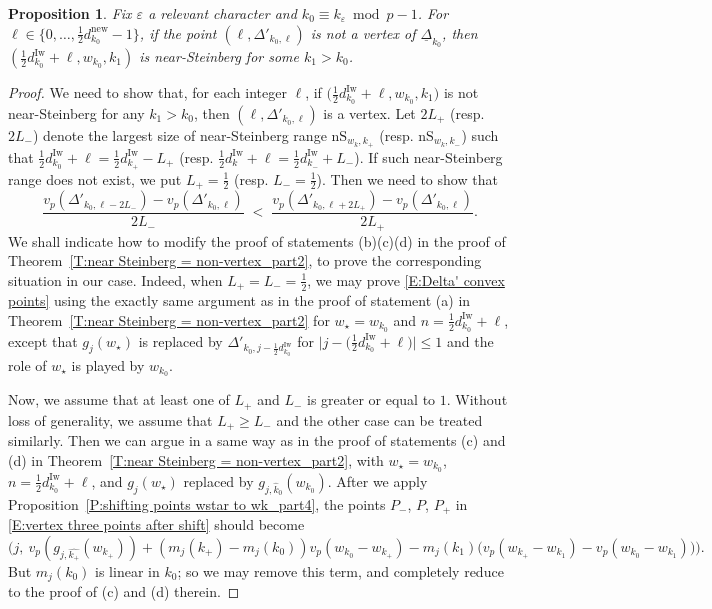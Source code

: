 \documentclass[12pt]{amsart}
\newtheorem{proposition}[subsection]{Proposition}
\theoremstyle{definition}
\numberwithin{equation}{subsection}
\newcommand{\new}{\mathrm{new}}
\newcommand{\Iw}{\mathrm{Iw}}
\newcommand{\nS}{\mathrm{nS}}
\begin{document}
\begin{proposition}
\label{P:vertices of Deltak_part2}
Fix $\varepsilon$ a relevant character and $k_0 \equiv k_\varepsilon \bmod p-1$.
For $\ell \in\{0, \dots, \frac12d_{k_0}^\new-1\}$, if the point $(\ell, \Delta'_{{k_0},\ell})$ is not a vertex of $\underline \Delta_{k_0}$, then $(\frac 12d_{k_0}^\Iw + \ell, w_{k_0}, k_1)$ is near-Steinberg for some  $k_1 > {k_0}$.
\end{proposition}
\begin{proof}
We need to show that, for each integer $\ell$, if $\big(\frac 12d_{k_0}^\Iw + \ell, w_{k_0}, k_1\big)$ is not  near-Steinberg for any $k_1 > {k_0}$, then $(\ell, \Delta'_{{k_0}, \ell})$ is a vertex. Let $2L_+$ (resp. $2L_-$) denote the largest size of near-Steinberg range $\nS_{w_k, k_+}$ (resp. $\nS_{w_k, k_-}$) such that $\frac 12d_{k_0}^\Iw+\ell = \frac 12d_{k_+}^\Iw-L_+$ (resp. $\frac 12d_k^\Iw+\ell = \frac 12d_{k_-}^\Iw+L_-$). If such near-Steinberg range does not exist, we put $L_+ = \frac 12$ (resp. $L_- = \frac 12$).
Then we need to show that
\begin{equation}
\label{E:Delta' convex points}
\frac{v_p(\Delta'_{k_0, \ell - 2L_-}) - v_p(\Delta'_{k_0, \ell})}{2L_-} \;<\; \frac{v_p(\Delta'_{k_0, \ell + 2L_+})-v_p(\Delta'_{k_0, \ell}) }{2L_+}.
\end{equation}
We shall indicate how to modify the proof of statements (b)(c)(d) in the proof of Theorem~\ref{T:near Steinberg = non-vertex_part2}, to prove the corresponding situation in our case.
Indeed, when $L_+ = L_-=\frac 12$, we may prove \eqref{E:Delta' convex points} using the exactly same argument as in the proof of statement (a) in Theorem~\ref{T:near Steinberg = non-vertex_part2} for $w_\star = w_{k_0}$ and $n = \frac 12d_{k_0}^\Iw+\ell$, except that $g_j(w_\star)$ is replaced by $\Delta'_{k_0, j - \frac 12 d_{k_0}^\Iw}$ for $\big|j -\big(\frac 12 d_{k_0}^\Iw+\ell\big)\big| \leq 1$ and the role of $w_\star$ is played by $w_{k_0}$.

Now, we assume that at least one of $L_+$ and $L_-$ is greater or equal to $1$. Without loss of generality, we assume that $L_+ \geq L_-$ and the other case can be treated similarly. Then we can argue in a same way as in the proof of statements (c) and (d) in Theorem~\ref{T:near Steinberg = non-vertex_part2}, with $w_\star = w_{k_0}$, $n = \frac 12d_{k_0}^\Iw+ \ell$, and $g_j(w_\star)$ replaced by $g_{j, \hat k_0}(w_{k_0})$. After we apply Proposition~\ref{P:shifting points wstar to wk_part4}, the points $P_-$, $P$, $P_+$ in \eqref{E:vertex three points after shift} should become
\begin{equation}
\label{E:vertex three points after shift Delta} \Big( j,\ v_p(g_{j, \hat{ k_+}}(w_{k_+})) + (m_j(k_+)- m_j(k_0))v_p(w_{k_0}-w_{k_+}) - m_j(k_1)\big(v_p(w_{k_+}-w_{k_1})- v_p(w_{k_0}-w_{k_1})  \big)\Big).
\end{equation}
But $m_j(k_0)$ is linear in $k_0$; so we may remove this term, and completely reduce to the proof of (c) and (d) therein.
\end{proof}
\end{document}

